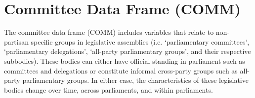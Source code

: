 \documentclass{article}
\begin{document}
\section{Committee Data Frame (\gls{COMM})}\label{COMM}
The committee data frame (\gls{COMM}) includes variables that relate to non-partisan specific groups in legislative assemblies (i.e. `parliamentary committees', `parliamentary delegations', `all-party parliamentary groups', and their respective subbodies). These bodies can either have official standing in parliament such as committees and delegations or constitute informal cross-party groups such as all-party parliamentary groups. In either case, the characteristics of these legislative bodies change over time, across parliaments, and within parliaments. 


\end{document}
